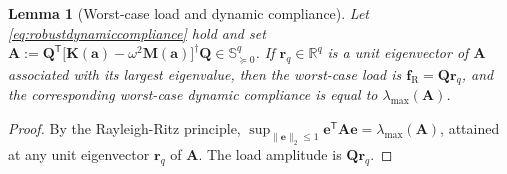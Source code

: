 \documentclass[10pt,a4paper]{amsart}
\newtheorem{lemma}{Lemma}
\newcommand{\R}{\mathrm{R}}
\newcommand{\T}{^{\mathsf T}}
\begin{document}
\begin{lemma}[Worst-case load and dynamic compliance]\label{lemma:worstload}
Let \eqref{eq:robustdynamiccompliance} hold and set $\mathbf{A}:=\mathbf{Q}\T\big[\mathbf{K}(\mathbf{a})-\omega^2\mathbf{M}(\mathbf{a})\big]^\dagger\mathbf{Q}\in\mathbb{S}^q_{\succeq 0}$. If $\mathbf{r}_q\in\mathbb{R}^q$ is a unit eigenvector of $\mathbf{A}$ associated with its largest eigenvalue, then the worst-case load is $\mathbf{f}_\R=\mathbf{Q}\mathbf{r}_q$, and the corresponding worst-case dynamic compliance is equal to $\lambda_{\max}(\mathbf{A})$.
\end{lemma}

\begin{proof}
By the Rayleigh-Ritz principle, $\sup_{\lVert\mathbf{e}\rVert_2\le 1}\mathbf{e}\T \mathbf{A}\mathbf{e}=\lambda_{\max}(\mathbf{A})$, attained at any unit eigenvector $\mathbf{r}_q$ of $\mathbf{A}$. The load amplitude is $\mathbf{Q}\mathbf{r}_q$.
\end{proof}
\end{document}
